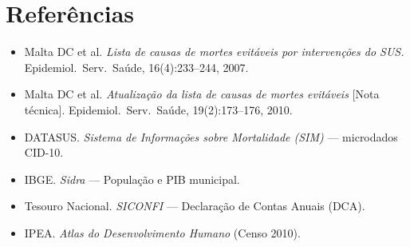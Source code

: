 \documentclass[11pt,a4paper]{article}
\begin{document}
\section*{Referências}
\begin{itemize}[nosep]
  \item Malta DC et al. \emph{Lista de causas de mortes evitáveis por intervenções do SUS.}
        Epidemiol.\ Serv.\ Saúde, 16(4):233--244, 2007.
  \item Malta DC et al. \emph{Atualização da lista de causas de mortes evitáveis}
        [Nota técnica]. Epidemiol.\ Serv.\ Saúde, 19(2):173--176, 2010.
  \item DATASUS. \emph{Sistema de Informações sobre Mortalidade (SIM)} --- microdados CID-10.
  \item IBGE. \emph{Sidra} --- População e PIB municipal.
  \item Tesouro Nacional. \emph{SICONFI} --- Declaração de Contas Anuais (DCA).
  \item IPEA. \emph{Atlas do Desenvolvimento Humano} (Censo 2010).
\end{itemize}
\end{document}
